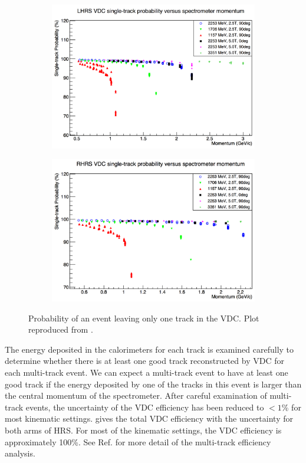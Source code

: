 \begin{figure}[b!]
  \centering
  \begin{subfigure}[t]{0.49\textwidth}
    \includegraphics[width=\textwidth]{figs/single-track-left.png}
  \end{subfigure}
  \begin{subfigure}[t]{0.49\textwidth}
    \includegraphics[width=\textwidth]{figs/single-track-right.png}
  \end{subfigure}
  \caption[Probability of an event leaving only one track in the VDC.]{Probability of an event leaving only one track in the VDC. Plot reproduced from \cite{Liu2013}. \label{C7S2F1}}
\end{figure}

The energy deposited in the calorimeters for each track is examined carefully to determine whether there is at least one good track reconstructed by VDC for each multi-track event. We can expect a multi-track event to have at least one good track if the energy deposited by one of the tracks in this event is larger than the central momentum of the spectrometer. After careful examination of multi-track events, the uncertainty of the VDC efficiency has been reduced to $<1$\% for most kinematic settings.  gives the total VDC efficiency with the uncertainty for both arms of HRS. For most of the kinematic settings, the VDC efficiency is approximately 100\%. See Ref. \cite{Liu2013} for more detail of the multi-track efficiency analysis.

